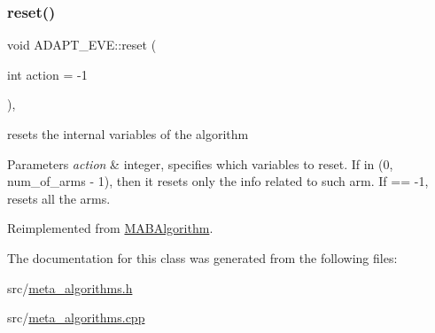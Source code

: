 \mbox{\label{class_a_d_a_p_t___e_v_e_aa89f094cbcba01accada672f0924a5f3}} 
\subsubsection{\texorpdfstring{reset()}{reset()}}
{\footnotesize\ttfamily void A\+D\+A\+P\+T\+\_\+\+E\+V\+E\+::reset (\begin{DoxyParamCaption}\item[{int}]{action = {\ttfamily -\/1} }\end{DoxyParamCaption})\hspace{0.3cm}{\ttfamily [override]}, {\ttfamily [virtual]}}



resets the internal variables of the algorithm 


\begin{DoxyParams}{Parameters}
{\em action} & integer, specifies which variables to reset. If in (0, num\+\_\+of\+\_\+arms -\/ 1), then it resets only the info related to such arm. If == -\/1, resets all the arms. \\
\hline
\end{DoxyParams}


Reimplemented from \mbox{\hyperlink{class_m_a_b_algorithm_ad5761cee0b0e3421d1f043dbcc0b5f85}{M\+A\+B\+Algorithm}}.



The documentation for this class was generated from the following files\+:\begin{DoxyCompactItemize}
\item 
src/\mbox{\hyperlink{meta__algorithms_8h}{meta\+\_\+algorithms.\+h}}\item 
src/\mbox{\hyperlink{meta__algorithms_8cpp}{meta\+\_\+algorithms.\+cpp}}\end{DoxyCompactItemize}
